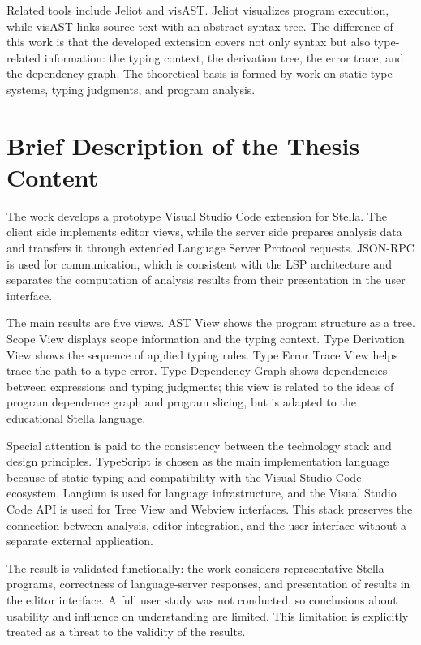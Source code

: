 ﻿\documentclass[14pt,a4paper]{extarticle}
\begin{document}
Related tools include Jeliot and visAST. Jeliot visualizes program execution, while visAST links source text with an abstract syntax tree. The difference of this work is that the developed extension covers not only syntax but also type-related information: the typing context, the derivation tree, the error trace, and the dependency graph. The theoretical basis is formed by work on static type systems, typing judgments, and program analysis.

\section*{Brief Description of the Thesis Content}

The work develops a prototype Visual Studio Code extension for Stella. The client side implements editor views, while the server side prepares analysis data and transfers it through extended Language Server Protocol requests. JSON-RPC is used for communication, which is consistent with the LSP architecture and separates the computation of analysis results from their presentation in the user interface.

The main results are five views. AST View shows the program structure as a tree. Scope View displays scope information and the typing context. Type Derivation View shows the sequence of applied typing rules. Type Error Trace View helps trace the path to a type error. Type Dependency Graph shows dependencies between expressions and typing judgments; this view is related to the ideas of program dependence graph and program slicing, but is adapted to the educational Stella language.

Special attention is paid to the consistency between the technology stack and design principles. TypeScript is chosen as the main implementation language because of static typing and compatibility with the Visual Studio Code ecosystem. Langium is used for language infrastructure, and the Visual Studio Code API is used for Tree View and Webview interfaces. This stack preserves the connection between analysis, editor integration, and the user interface without a separate external application.

The result is validated functionally: the work considers representative Stella programs, correctness of language-server responses, and presentation of results in the editor interface. A full user study was not conducted, so conclusions about usability and influence on understanding are limited. This limitation is explicitly treated as a threat to the validity of the results.
\end{document}

